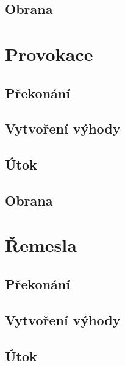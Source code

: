 \documentclass[../main.tex]{subfiles}
\begin{document}
\subsection*{Obrana}
\label{subsec:pozornost-obrana}
\obrana

\section{Provokace}
\label{sec:provokace}

\subsection*{Překonání}
\label{subsec:provokace-prekonani}
\prekonani

\subsection*{Vytvoření výhody}
\label{subsec:provokace-vytvoreni}
\vytvoreni

\subsection*{Útok}
\label{subsec:provokace-utok}
\utok

\subsection*{Obrana}
\label{subsec:provokace-obrana}
\obrana

\section{Řemesla}
\label{sec:remesla}

\subsection*{Překonání}
\label{subsec:remesla-prekonani}
\prekonani

\subsection*{Vytvoření výhody}
\label{subsec:remesla-vytvoreni}
\vytvoreni

\subsection*{Útok}
\label{subsec:remesla-utok}
\utok
\end{document}
